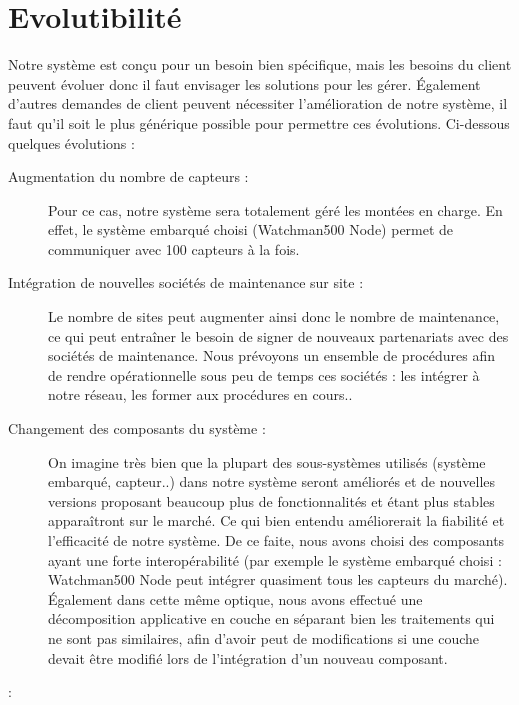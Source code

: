 \section{Evolutibilité}

Notre système est conçu pour un besoin bien spécifique, mais les besoins du client peuvent évoluer
donc il faut envisager les solutions pour les gérer.
Également d'autres demandes de client peuvent nécessiter l'amélioration de notre système, il faut qu'il soit
le plus générique possible pour permettre ces évolutions. Ci-dessous quelques évolutions :

\begin{description}
           \item[Augmentation du nombre de capteurs :] Pour ce cas, notre système sera totalement géré les montées en charge. En effet, le système embarqué choisi (Watchman500 Node) permet de communiquer avec 100 capteurs à la fois.
           \item[Intégration de nouvelles sociétés de maintenance sur site :] Le nombre de sites peut augmenter ainsi donc le nombre de maintenance, ce qui peut entraîner le besoin de signer de nouveaux partenariats avec des sociétés de maintenance. Nous prévoyons un ensemble de procédures afin de rendre opérationnelle sous peu de temps ces sociétés : les intégrer à notre réseau, les former aux procédures en cours..
           \item[Changement des composants du système :] On imagine très bien que la plupart des sous-systèmes utilisés (système embarqué, capteur..)
dans notre système seront améliorés et de nouvelles versions proposant beaucoup plus de fonctionnalités et étant plus stables apparaîtront sur le marché. Ce qui bien entendu améliorerait la fiabilité et l'efficacité de notre système. 
            De ce faite, nous avons choisi des composants ayant une forte interopérabilité (par exemple le système embarqué choisi : Watchman500 Node peut intégrer quasiment tous les capteurs du marché).
            Également dans cette même optique, nous avons effectué une décomposition applicative en couche en séparant bien les traitements qui ne sont pas similaires, afin d'avoir peut de modifications si une couche devait être modifié lors de l'intégration d'un nouveau composant.
           \item[ :] 
\end{description}
